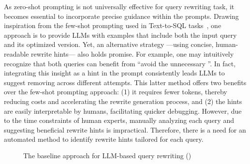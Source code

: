 As zero-shot prompting is not universally effective for query rewriting task,  it becomes essential to incorporate precise guidance within the prompts. Drawing inspiration from the few-shot prompting used in Text-to-SQL tasks~\cite{sun2306sql}, one approach is to provide LLMs with examples that include both the input query and its optimized version. Yet, an alternative strategy ---using concise, human-readable rewrite hints--- also holds promise.
For example, one may intuitively recognize that both queries can benefit from ``avoid the unnecessary \sqlunionallcolor''. In fact, integrating this insight as a hint in the prompt consistently leads LLMs to suggest removing \sqlunionallcolor across different attempts. This latter method offers two benefits over the few-shot prompting approach: (1) it requires fewer tokens, thereby reducing costs and accelerating the rewrite generation process, and (2) the hints are easily interpretable by humans, facilitating quicker debugging. However, due to the time constraints of human experts, manually analyzing each query and suggesting beneficial rewrite hints is impractical. Therefore, there is a need for an automated method to identify rewrite hints tailored for each query.



\begin{figure}[t]
\inv
  \centering
  \inv
  \captionsetup{font=small,name=Figure}
  \caption{The baseline approach for LLM-based query rewriting (\baseline)}
  \label{gen:fig:basic_prompt}
 \inv
\end{figure}






